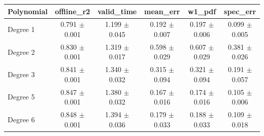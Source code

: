 \begin{tabular}{lccccc}
\toprule
Polynomial & offline\_r2 & valid\_time & mean\_err & w1\_pdf & spec\_err \\
\midrule
Degree 1 & 0.791 $\pm$ 0.001 & 1.199 $\pm$ 0.045 & 0.192 $\pm$ 0.007 & 0.197 $\pm$ 0.006 & 0.099 $\pm$ 0.005 \\
Degree 2 & 0.830 $\pm$ 0.001 & 1.319 $\pm$ 0.017 & 0.598 $\pm$ 0.029 & 0.607 $\pm$ 0.029 & 0.381 $\pm$ 0.026 \\
Degree 3 & 0.841 $\pm$ 0.001 & 1.340 $\pm$ 0.032 & 0.315 $\pm$ 0.094 & 0.321 $\pm$ 0.094 & 0.191 $\pm$ 0.057 \\
Degree 5 & 0.847 $\pm$ 0.001 & 1.380 $\pm$ 0.032 & 0.167 $\pm$ 0.016 & 0.174 $\pm$ 0.016 & 0.105 $\pm$ 0.006 \\
Degree 6 & 0.848 $\pm$ 0.001 & 1.394 $\pm$ 0.036 & 0.179 $\pm$ 0.033 & 0.188 $\pm$ 0.033 & 0.109 $\pm$ 0.018 \\
\bottomrule
\end{tabular}
